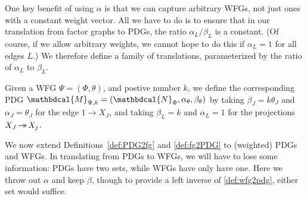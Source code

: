 \documentclass[letterpaper]{article} %
\theoremstyle{plain}
\theoremstyle{definition}
\theoremstyle{remark}
\newcommand{\tto}{\rightarrow\mathrel{\mspace{-15mu}}\rightarrow}
\newcommand{\dg}[1]{\mathbdcal{#1}}
\newcommand{\PDGof}[1]{{\dg M}_{#1}}
\newcommand{\UPDGof}[1]{{\dg N}_{#1}}
\begin{document}
One key benefit of using $\alpha$ is that we can
capture arbitrary WFGs, not just ones with a constant weight
vector.    All we have to do is to ensure that in our translation from
factor graphs to PDGs, the ratio $\alpha_L/\beta_L$ is a
constant.  (Of course, if we allow arbitrary weights, we cannot hope
to do this if $\alpha_L = 1$ for all edges $L$.)  
We therefore define a family of translations, parameterized by the
ratio of $\alpha_L$ to $\beta_L$.
\begin{defn}\label{def:wfg2pdg}
Given a WFG
$\Psi=(\Phi, \theta)$,
and postive number $k$, 
we define the corresponding PDG $\PDGof{\Psi,k} = (\UPDGof{\Phi},\alpha_{\theta}, \beta_{\theta})$ 
by taking $\beta_J = k \theta_J$ and $\alpha_J = \theta_J$ for the edge $1  \rightarrow X_J$, and
taking $\beta_L = k$ and $\alpha_L = 1$ for the projections $X_J \!\tto\! X_j$.
\end{defn}

We now extend Definitions~\ref{def:PDG2fg} and \ref{def:fg2PDG} to
(weighted) PDGs and WFGs.  In
translating from PDGs to WFGs, 
we will have to lose some information: PDGs have two sets, while WFGs have 
only have one. Here we throw out $\alpha$ and keep $\beta$, 
though to provide a left inverse of \cref{def:wfg2pdg}, either set would suffice.

\end{document}
